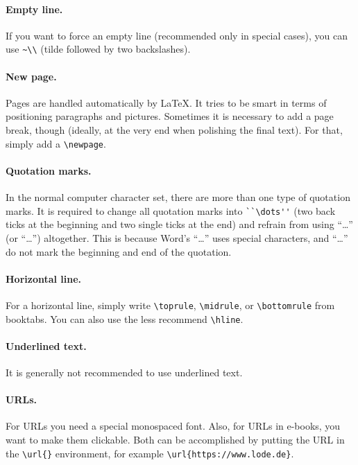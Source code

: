 \paragraph{Empty line.} If you want to force an empty line (recommended only in
special cases), you can use \lstinline[language=Tex]!~\\! (tilde followed by two
backslashes).

\paragraph{New page.} Pages are handled automatically by \LaTeX{}. It tries to
be smart in terms of positioning paragraphs and pictures. Sometimes it is
necessary to add a page break, though (ideally, at the very end when polishing
the final text). For that, simply add a \lstinline[language=Tex]!\newpage!.

\paragraph{Quotation marks.} In the normal computer character set, there are
more than one type of quotation marks. It is required to change all quotation
marks into \lstinline[language=Tex]!``\dots''! (two back ticks at the beginning
and two single ticks at the end) and refrain from using ``\dots'' (or “\dots”)
altogether. This is because Word's “\dots” uses special characters, and ``\dots'' do not mark the beginning and end of the quotation.

\paragraph{Horizontal line.} For a horizontal line, simply write \lstinline[language=Tex]!\toprule!, \lstinline[language=Tex]!\midrule!, or \lstinline[language=Tex]!\bottomrule! from booktabs. You can also use the less recommend \lstinline[language=Tex]!\hline!. %

\paragraph{Underlined text.} It is generally not recommended to use underlined
text.

\paragraph{URLs.} For URLs you need a special monospaced font. Also, for URLs in
e-books, you want to make them clickable. Both can be accomplished by putting
the URL in the \lstinline[language=Tex]!\url{}! environment, for example
\lstinline[language=Tex]!\url{https://www.lode.de}!.

